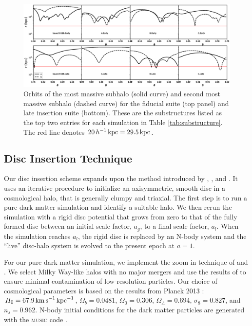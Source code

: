 \begin{figure}
	\hspace{-0.75in}
	\includegraphics[width=1.2\textwidth]{../figures/substructure_r_vs_t.eps}
	\caption{Orbits of the most massive subhalo (solid curve)
          and second most massive subhalo (dashed curve) for the
          fiducial suite (top panel) and late insertion suite
          (bottom). These are the substructures listed as the top two
          entries for each simulation in Table
          \ref{tab:substructure}. The red line denotes $20\, h^{-1} \, \text{kpc} =
          29.5 \, \text{kpc}$. } \label{fig:substructure_orbits}
\end{figure}

\subsection{Disc Insertion Technique} \label{ssec:disc_insertio}

Our disc insertion scheme \citep{bauer2018a} expands upon the method
introduced by \citet{BerentzenShlosmanStellarDisks},
\citet{debuhr_2012}, and \citet{ys_2015}. It uses an iterative
procedure to initialize an axisymmetric, smooth disc in a cosmological
halo, that is generally clumpy and triaxial. The first step is to run
a pure dark matter simulation and identify a suitable halo. We then
rerun the simulation with a rigid disc potential that grows from zero
to that of the fully formed disc between an initial scale factor,
$a_g$, to a final scale factor, $a_l$.  When the simulation reaches
$a_l$, the rigid disc is replaced by an N-body system and the ``live''
disc-halo system is evolved to the present epoch at $a=1$.

For our pure dark matter simulation, we implement the zoom-in
technique of \citet{KatzQuasarZoom} and \citet{NavarroWhiteZoom}.  We
select Milky Way-like halos with no major mergers and use the results
of \cite{onorbe_etal_2014} to ensure minimal contamination of
low-resolution particles.  Our choice of cosmological parameters is
based on the results from Planck 2013 \citep{planck_2014}:
$H_0=67.9\,{\rm km\,s}^{-1}\,{\rm kpc}^{-1}$, $\Omega_b = 0.0481$,
$\Omega_0 = 0.306$, $\Omega_\Lambda = 0.694$, $\sigma_8 = 0.827$, and
$n_s = 0.962$. N-body initial conditions for the dark matter particles
are generated with the \textsc{music} code \citep{music}.

